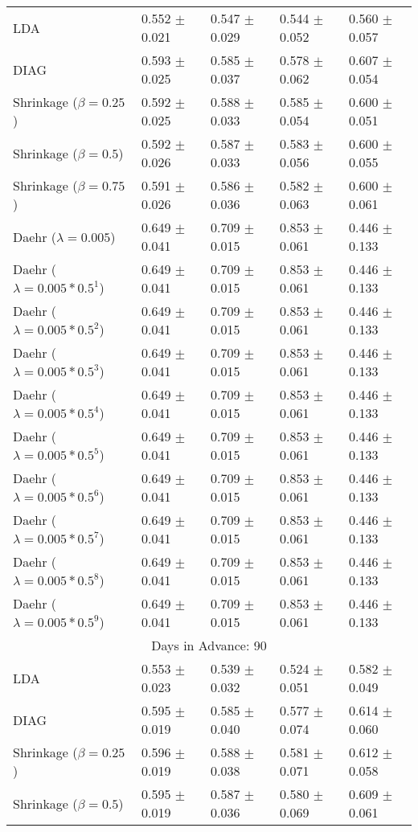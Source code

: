 \begin{table}
\begin{tabular}{*{5}{l}}
LDA&0.552 $\pm$ 0.021&0.547 $\pm$ 0.029&0.544 $\pm$ 0.052&0.560 $\pm$ 0.057\\
DIAG&0.593 $\pm$ 0.025&0.585 $\pm$ 0.037&0.578 $\pm$ 0.062&0.607 $\pm$ 0.054\\
Shrinkage ($\beta=0.25$)&0.592 $\pm$ 0.025&0.588 $\pm$ 0.033&0.585 $\pm$ 0.054&0.600 $\pm$ 0.051\\
Shrinkage ($\beta=0.5$)&0.592 $\pm$ 0.026&0.587 $\pm$ 0.033&0.583 $\pm$ 0.056&0.600 $\pm$ 0.055\\
Shrinkage ($\beta=0.75$)&0.591 $\pm$ 0.026&0.586 $\pm$ 0.036&0.582 $\pm$ 0.063&0.600 $\pm$ 0.061\\
Daehr ($\lambda=0.005$)&0.649 $\pm$ 0.041&0.709 $\pm$ 0.015&0.853 $\pm$ 0.061&0.446 $\pm$ 0.133\\
Daehr ($\lambda=0.005*0.5^1$)&0.649 $\pm$ 0.041&0.709 $\pm$ 0.015&0.853 $\pm$ 0.061&0.446 $\pm$ 0.133\\
Daehr ($\lambda=0.005*0.5^2$)&0.649 $\pm$ 0.041&0.709 $\pm$ 0.015&0.853 $\pm$ 0.061&0.446 $\pm$ 0.133\\
Daehr ($\lambda=0.005*0.5^3$)&0.649 $\pm$ 0.041&0.709 $\pm$ 0.015&0.853 $\pm$ 0.061&0.446 $\pm$ 0.133\\
Daehr ($\lambda=0.005*0.5^4$)&0.649 $\pm$ 0.041&0.709 $\pm$ 0.015&0.853 $\pm$ 0.061&0.446 $\pm$ 0.133\\
Daehr ($\lambda=0.005*0.5^5$)&0.649 $\pm$ 0.041&0.709 $\pm$ 0.015&0.853 $\pm$ 0.061&0.446 $\pm$ 0.133\\
Daehr ($\lambda=0.005*0.5^6$)&0.649 $\pm$ 0.041&0.709 $\pm$ 0.015&0.853 $\pm$ 0.061&0.446 $\pm$ 0.133\\
Daehr ($\lambda=0.005*0.5^7$)&0.649 $\pm$ 0.041&0.709 $\pm$ 0.015&0.853 $\pm$ 0.061&0.446 $\pm$ 0.133\\
Daehr ($\lambda=0.005*0.5^8$)&0.649 $\pm$ 0.041&0.709 $\pm$ 0.015&0.853 $\pm$ 0.061&0.446 $\pm$ 0.133\\
Daehr ($\lambda=0.005*0.5^9$)&0.649 $\pm$ 0.041&0.709 $\pm$ 0.015&0.853 $\pm$ 0.061&0.446 $\pm$ 0.133\\
\hline\multicolumn{5}{c}{  Days in Advance: 90}\\\hline
LDA&0.553 $\pm$ 0.023&0.539 $\pm$ 0.032&0.524 $\pm$ 0.051&0.582 $\pm$ 0.049\\
DIAG&0.595 $\pm$ 0.019&0.585 $\pm$ 0.040&0.577 $\pm$ 0.074&0.614 $\pm$ 0.060\\
Shrinkage ($\beta=0.25$)&0.596 $\pm$ 0.019&0.588 $\pm$ 0.038&0.581 $\pm$ 0.071&0.612 $\pm$ 0.058\\
Shrinkage ($\beta=0.5$)&0.595 $\pm$ 0.019&0.587 $\pm$ 0.036&0.580 $\pm$ 0.069&0.609 $\pm$ 0.061\\

\end{tabular}
\end{table}
